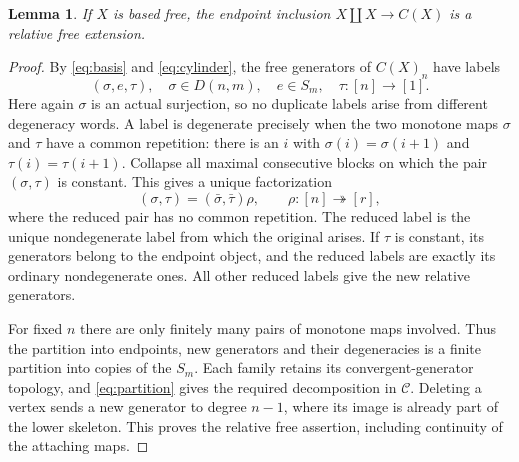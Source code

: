 \documentclass[11pt,a4paper]{article}
\newtheorem{lemma}[theorem]{Lemma}
\theoremstyle{definition}
\newcommand{\C}{\mathcal C}
\begin{document}
\begin{lemma}\label{lem:cylinder}
If $X$ is based free, the endpoint inclusion
$X\amalg X\to C(X)$ is a relative free extension.
\end{lemma}
\begin{proof}
By \eqref{eq:basis} and \eqref{eq:cylinder}, the free generators of
$C(X)_n$ have labels
\[
 (\sigma,e,\tau),\quad
 \sigma\in D(n,m),\quad e\in S_m,\quad
 \tau:[n]\to[1].
\]
Here again $\sigma$ is an actual surjection, so no duplicate labels arise
from different degeneracy words. A label is degenerate precisely when
the two monotone maps $\sigma$ and $\tau$ have a common repetition: there is an $i$ with
$\sigma(i)=\sigma(i+1)$ and $\tau(i)=\tau(i+1)$.
Collapse all maximal consecutive blocks on which the pair
$(\sigma,\tau)$ is constant. This gives a unique factorization
\[
 (\sigma,\tau)=(\bar\sigma,\bar\tau)\rho,
 \qquad \rho:[n]\twoheadrightarrow[r],
\]
where the reduced pair has no common repetition. The reduced label
is the unique nondegenerate label from which the original arises.
If $\tau$ is constant, its generators belong to the endpoint object,
and the reduced labels are exactly its ordinary nondegenerate ones.
All other reduced labels give the new relative generators.

For fixed $n$ there are only finitely many pairs of monotone maps
involved. Thus the partition into endpoints, new generators and
their degeneracies is a finite partition into copies of the $S_m$.
Each family retains its convergent-generator topology, and
\eqref{eq:partition} gives the required decomposition in $\C$.
Deleting a vertex sends a new generator to degree $n-1$, where its
image is already part of the lower skeleton. This proves the
relative free assertion, including continuity of the attaching maps.
\end{proof}
\end{document}
